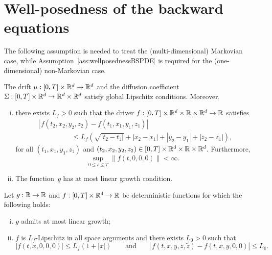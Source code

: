 \section{Well-posedness of the backward equations}
\label{apx:wellposedness}

The following assumption is needed to treat the (multi-dimensional) Markovian case,
while Assumption~\ref{ass:wellposednessBSPDE} is required for the (one-dimensional) non-Markovian case.

\begin{assumption}\label{ass:wellposednessBSDE}
The drift $\mu: [0, T]\times\mathbb{R}^d\rightarrow\mathbb{R}^d$ and the diffusion coefficient $\Sigma:[0, T]\times\mathbb{R}^d\rightarrow\mathbb{R}^d\times\mathbb{R}^d$ satisfy global Lipschitz conditions. Moreover,
\begin{enumerate}[i)]
    \item there exists $L_f>0$ such that the driver $f:[0,T]\times \mathbb{R}^d \times \mathbb{R} \times \mathbb{R}^{d} \rightarrow \mathbb{R}$ satisfies
    \begin{align*}
    &\left|f\left(t_2, x_2, y_2, z_2\right)-f\left(t_1, x_1, y_1, z_1\right)\right| \\
    & \hspace{2cm} \leq L_f\left(\sqrt{\left|t_2-t_1\right|}+\left|x_2-x_1\right|+\left|y_2-y_1\right|+\left|z_2-z_1\right|\right),
    \end{align*}
    for all $\left(t_1, x_1, y_1, z_1\right)$ and $\left(t_2, x_2, y_2, z_2\right) \in[0, T] \times \mathbb{R}^d \times \mathbb{R} \times \mathbb{R}^{d}$. Furthermore,
    $$
    \sup_{0 \leq t \leq T}\|f(t, 0,0,0)\|<\infty .
    $$
    \item The function~$g$ has at most linear growth condition.
\end{enumerate}
\end{assumption}
\begin{assumption}\label{ass:wellposednessBSPDE}
Let $g:\mathbb{R}\rightarrow\mathbb{R}$ and $f:[0,T]\times\mathbb{R}^4\rightarrow\mathbb{R}$
be deterministic functions for which the following holds:
\begin{enumerate}[i)]
    \item $g$ admits at most linear growth;
    \item $f$ is $L_f$-Lipschitz in all space arguments and there exists $L_0>0$ such that
    $$
    |f(t,x,0,0,0)| \leq L_f(1+|x|) 
        \qquad\text{and}\qquad
        |f(t,x,y,z,\widetilde{z})-f(t,x,y,0,0)| \leq L_0.
        $$\end{enumerate}
\end{assumption}
